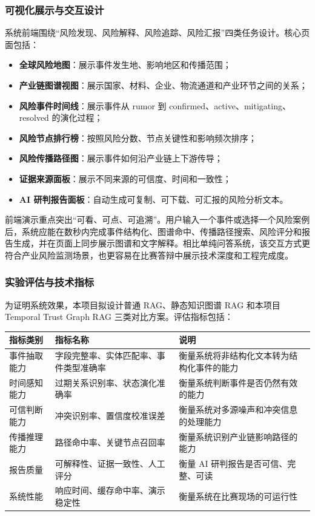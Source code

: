 ﻿\documentclass[12pt,a4paper]{article}
\newcommand{\term}[1]{\textbf{#1}}
\begin{document}
\subsubsection{可视化展示与交互设计}

系统前端围绕“风险发现、风险解释、风险追踪、风险汇报”四类任务设计。核心页面包括：
\begin{itemize}
    \item \term{全球风险地图}：展示事件发生地、影响地区和传播范围；
    \item \term{产业链图谱视图}：展示国家、材料、企业、物流通道和产业环节之间的关系；
    \item \term{风险事件时间线}：展示事件从 rumor 到 confirmed、active、mitigating、resolved 的演化过程；
    \item \term{风险节点排行榜}：按照风险分数、节点关键性和影响频次排序；
    \item \term{风险传播路径图}：展示事件如何沿产业链上下游传导；
    \item \term{证据来源面板}：展示不同来源的可信度、时间和一致性；
    \item \term{AI 研判报告面板}：自动生成可复制、可下载、可汇报的风险分析文本。
\end{itemize}

前端演示重点突出“可看、可点、可追溯”。用户输入一个事件或选择一个风险案例后，系统应能在数秒内完成事件结构化、图谱命中、传播路径搜索、风险评分和报告生成，并在页面上同步展示图谱和文字解释。相比单纯问答系统，该交互方式更符合产业风险监测场景，也更容易在比赛答辩中展示技术深度和工程完成度。

\subsubsection{实验评估与技术指标}

为证明系统效果，本项目拟设计普通 RAG、静态知识图谱 RAG 和本项目 Temporal Trust Graph RAG 三类对比方案。评估指标包括：
\begin{center}
\begin{tabularx}{0.95\linewidth}{>{\raggedright\arraybackslash}p{3.2cm} >{\raggedright\arraybackslash}p{3.6cm} >{\raggedright\arraybackslash}X}
\toprule
指标类别 & 指标名称 & 说明 \\
\midrule
事件抽取能力 & 字段完整率、实体匹配率、事件类型准确率 & 衡量系统将非结构化文本转为结构化事件的能力 \\
时间感知能力 & 过期关系识别率、状态演化准确率 & 衡量系统判断事件是否仍然有效的能力 \\
可信判断能力 & 冲突识别率、置信度校准误差 & 衡量系统对多源噪声和冲突信息的处理能力 \\
传播推理能力 & 路径命中率、关键节点召回率 & 衡量系统识别产业链影响路径的能力 \\
报告质量 & 可解释性、证据一致性、人工评分 & 衡量 AI 研判报告是否可信、完整、可读 \\
系统性能 & 响应时间、缓存命中率、演示稳定性 & 衡量系统在比赛现场的可运行性 \\
\bottomrule
\end{tabularx}
\end{center}
\end{document}
